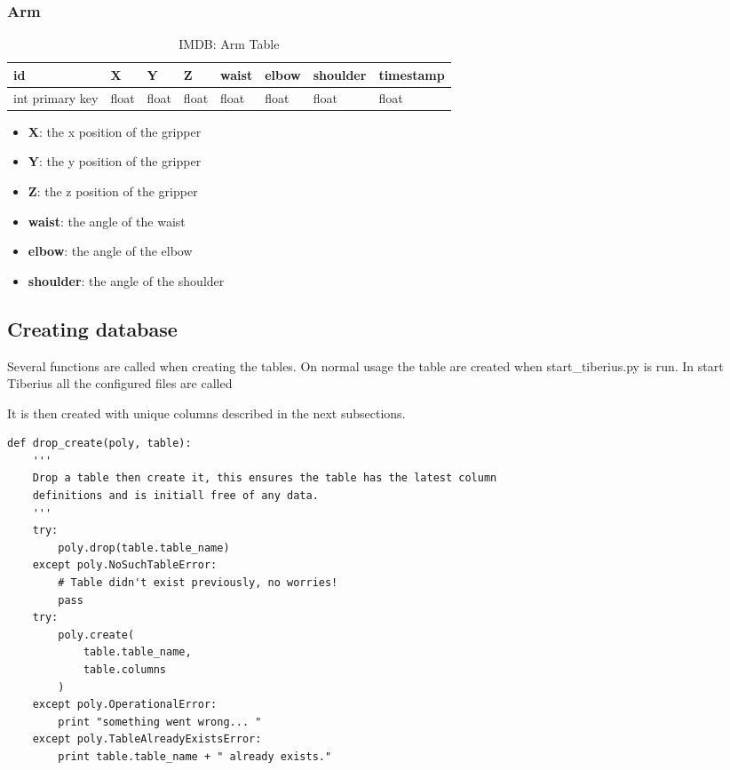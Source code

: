 \subsubsection{Arm}
\begin{table}[!htb]
\centering
\begin{tabular}{|l|l|l|l|l|l|l|l|}
\toprule
id              & X     & Y     & Z     & waist & elbow & shoulder & timestamp \\ \midrule
int primary key & float & float & float & float & float & float    & float
\end{tabular}
\caption{IMDB: Arm Table}
\label{tab:db-arm}
\end{table}
\begin{itemize}
\item{\textbf{X}}: the x position of the gripper 
\item{\textbf{Y}}: the y position of the gripper
\item{\textbf{Z}}: the z position of the gripper
\item{\textbf{waist}}: the angle of the waist
\item{\textbf{elbow}}: the angle of the elbow
\item{\textbf{shoulder}}: the angle of the shoulder
\end{itemize}

\subsection{Creating database}
Several functions are called when creating the tables. On normal usage the table are created when start\_tiberius.py is run. In start Tiberius all the configured files are called




It is then created with unique columns described in the next subsections.

\begin{lstlisting}[style=custompython]
def drop_create(poly, table):
    '''
    Drop a table then create it, this ensures the table has the latest column
    definitions and is initiall free of any data.
    '''
    try:
        poly.drop(table.table_name)
    except poly.NoSuchTableError:
        # Table didn't exist previously, no worries!
        pass
    try:
        poly.create(
            table.table_name,
            table.columns
        )
    except poly.OperationalError:
        print "something went wrong... "
    except poly.TableAlreadyExistsError:
        print table.table_name + " already exists."
\end{lstlisting}

